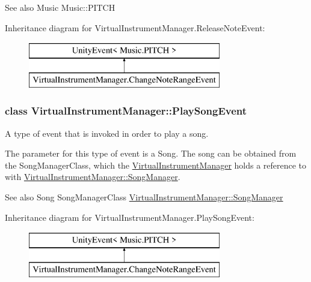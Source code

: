 \begin{DoxySeeAlso}{See also}
Music Music\+::\+P\+I\+T\+CH 
\end{DoxySeeAlso}
Inheritance diagram for Virtual\+Instrument\+Manager.\+Release\+Note\+Event\+:\begin{figure}[H]
\begin{center}
\leavevmode
\includegraphics[height=2.000000cm]{group___virtual_instrument_manager}
\end{center}
\end{figure}
\label{class_virtual_instrument_manager_1_1_play_song_event}
\subsubsection{class Virtual\+Instrument\+Manager\+:\+:Play\+Song\+Event}
A type of event that is invoked in order to play a song. 

The parameter for this type of event is a Song. The song can be obtained from the Song\+Manager\+Class, which the \hyperlink{group___virtual_instrument_manager_class_virtual_instrument_manager}{Virtual\+Instrument\+Manager} holds a reference to with \hyperlink{group___virtual_instrument_manager_a33dae94932c10c66db76a0eebec76b01}{Virtual\+Instrument\+Manager\+::\+Song\+Manager}.

\begin{DoxySeeAlso}{See also}
Song Song\+Manager\+Class \hyperlink{group___virtual_instrument_manager_a33dae94932c10c66db76a0eebec76b01}{Virtual\+Instrument\+Manager\+::\+Song\+Manager} 
\end{DoxySeeAlso}
Inheritance diagram for Virtual\+Instrument\+Manager.\+Play\+Song\+Event\+:\begin{figure}[H]
\begin{center}
\leavevmode
\includegraphics[height=2.000000cm]{group___virtual_instrument_manager}
\end{center}
\end{figure}
\label{class_virtual_instrument_manager_1_1_play_note_event}
